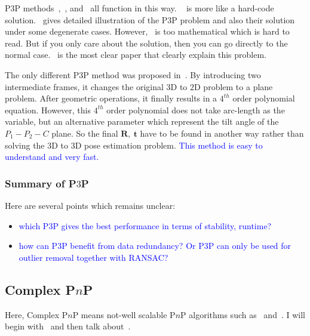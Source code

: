 \documentclass[a4paper]{article}
\begin{document}
P$3$P methods~\cite{fischler1981random},~\cite{gao2003complete}, and~\cite{li2011stable} all function in this way. ~\cite{fischler1981random} is more like a hard-code solution.~\cite{gao2003complete} gives detailed illustration of the P$3$P problem and also their solution under some degenerate cases. However,~\cite{gao2003complete} is too mathematical which is hard to read. But if you only care about the solution, then you can go directly to the normal case.~\cite{li2011stable} is the most clear paper that clearly explain this problem.


The only different P$3$P method was proposed in~\cite{kneip2011novel}. By introducing two intermediate frames, it changes the original $3$D to $2$D problem to a plane problem. After geometric operations, it finally results in a $4^{th}$ order polynomial equation. However, this $4^{th}$ order polynomial does not take arc-length as the variable, but an alternative parameter which represent the tilt angle of the $P_1-P_2-C$ plane. So the final $\mathbf{R},\ \mathbf{t}$ have to be found in another way rather than solving the $3$D to $3$D pose estimation problem. \textcolor{blue}{This method is easy to understand and very fast.}

\subsubsection{Summary of P$3$P}
Here are several points which remains unclear:
\begin{itemize}
\item \textcolor{blue}{which P$3$P gives the best performance in terms of stability, runtime?}
\item \textcolor{blue}{how can P$3$P benefit from data redundancy? Or P$3$P can only be used for outlier removal together with RANSAC?}
\end{itemize}

\subsection{Complex P$n$P}
Here, Complex P$n$P means not-well scalable P$n$P algorithms such as~\cite{quan1999linear} and~\cite{ansar2003linear}. I will begin with~\cite{quan1999linear} and then talk about~\cite{ansar2003linear}.
\end{document}
